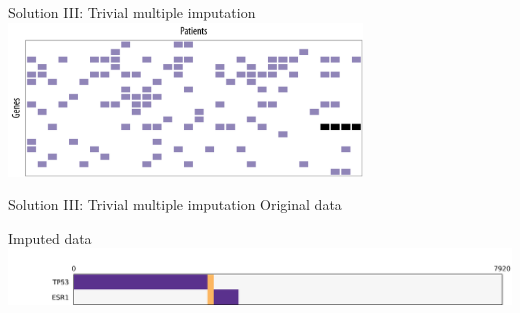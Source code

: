 \documentclass[mathserif]{beamer}
\begin{document}
\begin{frame}{Solution III: Trivial multiple imputation}
  \centering
  \includegraphics[width=3.7in]{figures/example1_missing.pdf}
  
  \vspace{2em}
\end{frame}

\begin{frame}{Solution III: Trivial multiple imputation}
  \centering
  Original data
  
  \vspace{3em}
  Imputed data
  \includegraphics[width=\textwidth,trim={2cm 0 0 1cm},clip]{figures/group_filled.pdf}
\end{frame}
\end{document}
